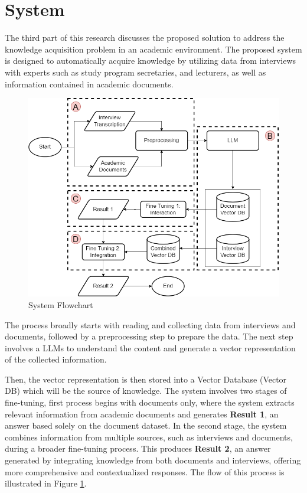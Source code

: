 \documentclass[runningheads]{llncs}
\begin{document}
\section{System}
The third part of this research discusses the proposed solution to address the knowledge acquisition problem in an academic environment. The proposed system is designed to automatically acquire knowledge by utilizing data from interviews with experts such as study program secretaries, and lecturers, as well as information contained in academic documents. 

\begin{figure}
    \centerline{\includegraphics[scale=0.3]{eng-main.png}}
    \caption{System Flowchart}
    \label{fig:main-flowchart}
\end{figure}

The process broadly starts with reading and collecting data from interviews and documents, followed by a preprocessing step to prepare the data. The next step involves a LLMs to understand the content and generate a vector representation of the collected information. 

Then, the vector representation is then stored into a Vector Database (Vector DB) which will be the source of knowledge. The system involves two stages of fine-tuning, first process begins with documents only, where the system extracts relevant information from academic documents and generates \textbf{Result 1}, an answer based solely on the document dataset. In the second stage, the system combines information from multiple sources, such as interviews and documents, during a broader fine-tuning process. This produces \textbf{Result 2}, an answer generated by integrating knowledge from both documents and interviews, offering more comprehensive and contextualized responses. The flow of this process is illustrated in Figure \ref{fig:main-flowchart}.
\end{document}
